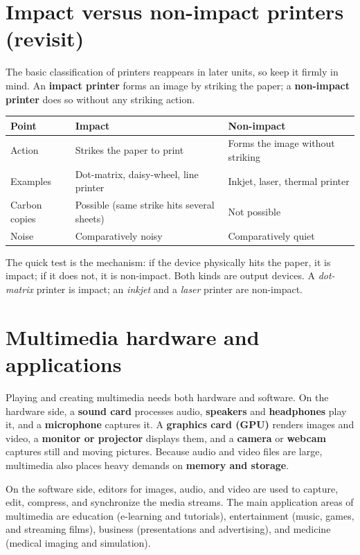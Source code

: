 \documentclass[11pt]{article}
\begin{document}
\section{Impact versus non-impact printers (revisit)}
The basic classification of printers reappears in later units, so keep it
firmly in mind. An \textbf{impact printer} forms an image by striking the
paper; a \textbf{non-impact printer} does so without any striking action.

\begin{center}
\begin{tabular}{p{}p{}p{}}
\toprule
\textbf{Point} & \textbf{Impact} & \textbf{Non-impact} \\
\midrule
Action & Strikes the paper to print & Forms the image without striking \\
Examples & Dot-matrix, daisy-wheel, line printer & Inkjet, laser, thermal printer \\
Carbon copies & Possible (same strike hits several sheets) & Not possible \\
Noise & Comparatively noisy & Comparatively quiet \\
\bottomrule
\end{tabular}
\end{center}

The quick test is the mechanism: if the device physically hits the paper, it
is impact; if it does not, it is non-impact. Both kinds are output devices. A
\emph{dot-matrix} printer is impact; an \emph{inkjet} and a \emph{laser}
printer are non-impact.

\section{Multimedia hardware and applications}
Playing and creating multimedia needs both hardware and software. On the
hardware side, a \textbf{sound card} processes audio, \textbf{speakers} and
\textbf{headphones} play it, and a \textbf{microphone} captures it. A
\textbf{graphics card (GPU)} renders images and video, a \textbf{monitor or
projector} displays them, and a \textbf{camera} or \textbf{webcam} captures
still and moving pictures. Because audio and video files are large, multimedia
also places heavy demands on \textbf{memory and storage}.

On the software side, editors for images, audio, and video are used to
capture, edit, compress, and synchronize the media streams. The main
application areas of multimedia are education (e-learning and tutorials),
entertainment (music, games, and streaming films), business (presentations
and advertising), and medicine (medical imaging and simulation).
\end{document}

